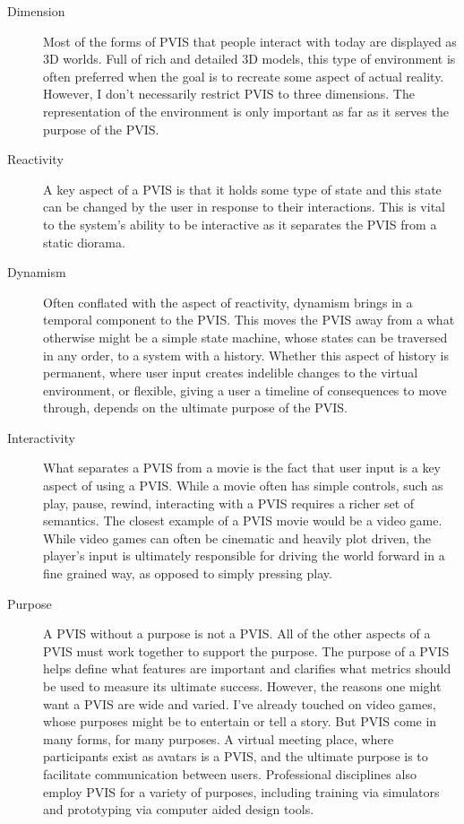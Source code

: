 \documentclass[12pt,oneside,letterpaper]{memoir}
\begin{document}
\begin{description}
\item[Dimension] Most of the forms of PVIS that people interact with
  today are displayed as 3D worlds. Full of rich and detailed 3D
  models, this type of environment is often preferred when the goal is
  to recreate some aspect of actual reality. However, I don't
  necessarily restrict PVIS to three dimensions. The representation
  of the environment is only important as far as it serves the purpose
  of the PVIS.

\item[Reactivity] A key aspect of a PVIS is that it holds some type of
  state and this state can be changed by the user in response to their
  interactions. This is vital to the system's ability to be
  interactive as it separates the PVIS from a static diorama.

\item[Dynamism] Often conflated with the aspect of reactivity, dynamism
  brings in a temporal component to the PVIS. This moves the PVIS away
  from a what otherwise might be a simple state machine, whose states
  can be traversed in any order, to a system with a history. Whether
  this aspect of history is permanent, where user input creates
  indelible changes to the virtual environment, or flexible, giving a
  user a timeline of consequences to move through, depends on the
  ultimate purpose of the PVIS.

\item[Interactivity] What separates a PVIS from a movie is the fact
  that user input is a key aspect of using a PVIS. While a movie often
  has simple controls, such as play, pause, rewind, interacting with a
  PVIS requires a richer set of semantics. The closest example of a
  PVIS movie would be a video game. While video games can often be
  cinematic and heavily plot driven, the player's input is ultimately
  responsible for driving the world forward in a fine grained way, as
  opposed to simply pressing play.

\item[Purpose] A PVIS without a purpose is not a PVIS. All of the
  other aspects of a PVIS must work together to support the
  purpose. The purpose of a PVIS helps define what features are
  important and clarifies what metrics should be used to measure its
  ultimate success. However, the reasons one might want a PVIS are
  wide and varied. I've already touched on video games, whose purposes
  might be to entertain or tell a story. But PVIS come in many forms,
  for many purposes. A virtual meeting place, where participants exist
  as avatars is a PVIS, and the ultimate purpose is to facilitate
  communication between users. Professional disciplines also employ
  PVIS for a variety of purposes, including training via simulators
  and prototyping via computer aided design tools.
      
\end{description}
\end{document}
